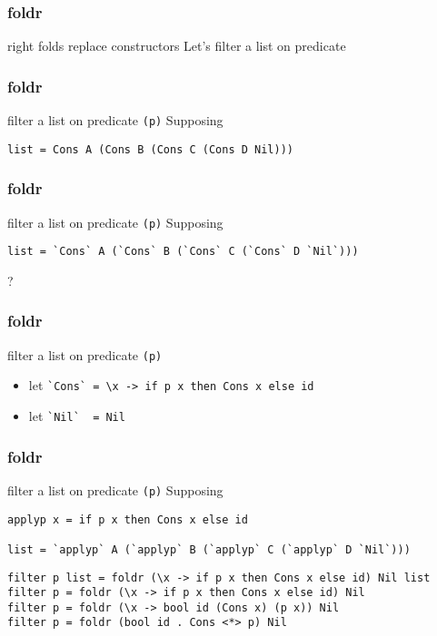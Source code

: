 %

\begin{frame}[fragile]
\frametitle{foldr}
\begin{block}{right folds replace constructors}
Let's filter a list on predicate
\end{block}
\end{frame}

\begin{frame}[fragile]
\frametitle{foldr}
\begin{block}{filter a list on predicate \lstinline{(p)}}
Supposing 
\begin{lstlisting}[style=haskell,basicstyle=\tiny\ttfamily,mathescape]
list = Cons A (Cons B (Cons C (Cons D Nil)))
\end{lstlisting}
\end{block}
\end{frame}

\begin{frame}[fragile]
\frametitle{foldr}
\begin{block}{filter a list on predicate \lstinline{(p)}}
Supposing 
\begin{lstlisting}[style=haskell,basicstyle=\tiny\ttfamily,mathescape]
list = `Cons` A (`Cons` B (`Cons` C (`Cons` D `Nil`)))
\end{lstlisting}
\end{block}
\begin{center}
\LARGE
?
\end{center}
\end{frame}

\begin{frame}[fragile]
\frametitle{foldr}
\begin{block}{filter a list on predicate \lstinline{(p)}}
\begin{itemize}
\item let \lstinline{`Cons` = \x -> if p x then Cons x else id}
\item let \lstinline{`Nil`  = Nil}
\end{itemize}
\end{block}
\end{frame}

\begin{frame}[fragile]
\frametitle{foldr}
\begin{block}{filter a list on predicate \lstinline{(p)}}
Supposing
\begin{lstlisting}[style=haskell,basicstyle=\tiny\ttfamily,mathescape]
applyp x = if p x then Cons x else id

list = `applyp` A (`applyp` B (`applyp` C (`applyp` D `Nil`)))
\end{lstlisting}
\end{block}
\begin{lstlisting}[style=haskell,basicstyle=\scriptsize\ttfamily,mathescape]
filter p list = foldr (\x -> if p x then Cons x else id) Nil list
filter p = foldr (\x -> if p x then Cons x else id) Nil
filter p = foldr (\x -> bool id (Cons x) (p x)) Nil
filter p = foldr (bool id . Cons <*> p) Nil
\end{lstlisting}
\end{frame}

